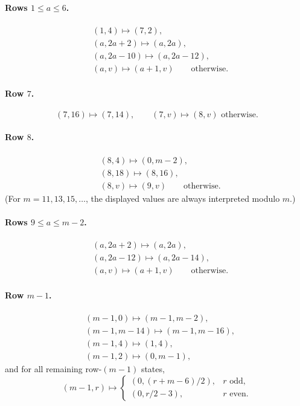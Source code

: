 \documentclass[11pt]{article}
\begin{document}
\paragraph{Rows $1\le a\le 6$.}
\begin{align*}
&(1,4)\mapsto (7,2),\\
&(a,2a+2)\mapsto (a,2a),\\
&(a,2a-10)\mapsto (a,2a-12),\\
&(a,v)\mapsto (a+1,v)\qquad\text{otherwise.}
\end{align*}

\paragraph{Row $7$.}
\[
(7,16)\mapsto (7,14),
\qquad
(7,v)\mapsto (8,v)\text{ otherwise.}
\]

\paragraph{Row $8$.}
\begin{align*}
&(8,4)\mapsto (0,m-2),\\
&(8,18)\mapsto (8,16),\\
&(8,v)\mapsto (9,v)\qquad\text{otherwise.}
\end{align*}
(For $m=11,13,15,\dots$, the displayed values are always interpreted modulo
$m$.)

\paragraph{Rows $9\le a\le m-2$.}
\begin{align*}
&(a,2a+2)\mapsto (a,2a),\\
&(a,2a-12)\mapsto (a,2a-14),\\
&(a,v)\mapsto (a+1,v)\qquad\text{otherwise.}
\end{align*}

\paragraph{Row $m-1$.}
\begin{align*}
&(m-1,0)\mapsto (m-1,m-2),\\
&(m-1,m-14)\mapsto (m-1,m-16),\\
&(m-1,4)\mapsto (1,4),\\
&(m-1,2)\mapsto (0,m-1),
\end{align*}
and for all remaining row-$(m-1)$ states,
\[
(m-1,r)\mapsto
\begin{cases}
(0,(r+m-6)/2), & r\text{ odd},\\
(0,r/2-3), & r\text{ even}.
\end{cases}
\]
\end{document}
